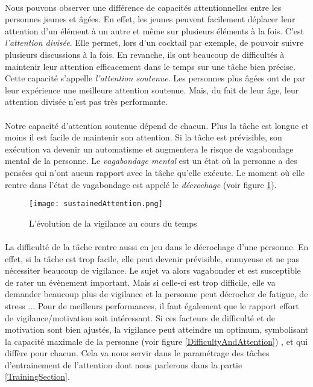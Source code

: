 \paragraph{}Nous pouvons observer une différence de capacités attentionnelles entre les personnes jeunes et âgées. En effet, les jeunes peuvent facilement déplacer leur attention
d'un élément à un autre et même sur plusieurs éléments à la fois. C'est \emph{l'attention divisée}. Elle permet, lors d'un cocktail par exemple, de pouvoir suivre plusieurs discussions
à la fois. En revanche, ils ont beaucoup de difficultés à maintenir leur attention efficacement dans le temps sur une tâche bien précise. Cette capacité s'appelle
\emph{l'attention soutenue}. Les personnes plus âgées ont de par leur expérience une meilleure attention soutenue. Mais, du fait de leur âge, leur attention divisée n'est pas très
performante.

\paragraph{}Notre capacité d'attention soutenue dépend de chacun. Plus la tâche est longue et moins il est facile de maintenir son attention. Si la tâche est prévisible, son exécution
va devenir un automatisme et augmentera le risque de vagabondage mental de la personne. Le \emph{vagabondage mental} est un état où la personne a des pensées qui n'ont aucun rapport
avec la tâche qu'elle exécute. Le moment où elle rentre dans l'état de vagabondage est appelé le \emph{décrochage} (voir figure \ref{SustainedAttention}).

\begin{figure}[h]
    \begin{center}
    \texttt{[image: sustainedAttention.png]}
    \end{center}
    \caption{L'évolution de la vigilance au cours du temps}
\label{SustainedAttention}
\end{figure}

\paragraph{}La difficulté de la tâche rentre aussi en jeu dans le décrochage d'une personne. En effet, si la tâche est trop facile, elle peut devenir prévisible, ennuyeuse et ne
pas nécessiter beaucoup de vigilance. Le sujet va alors vagabonder et est susceptible de rater un évènement important. Mais si celle-ci est trop difficile, elle va demander beaucoup
plus de vigilance et la personne peut décrocher de fatigue, de stress ... Pour de meilleurs performances, il faut également que le rapport effort de vigilance/motivation soit
intéressant. Si ces facteurs de difficulté et de motivation sont bien ajustés, la vigilance peut atteindre un optimum, symbolisant la capacité maximale de la personne (voir figure
\ref{DifficultyAndAttention}) , et qui diffère pour chacun. Cela va nous servir dans le paramétrage des tâches d'entrainement de l'attention dont nous parlerons dans la partie
\ref{TrainingSection}.

